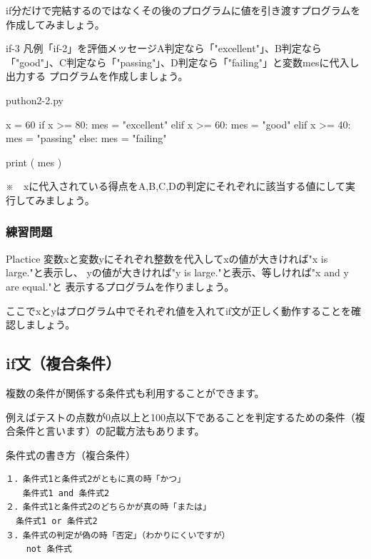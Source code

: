 \documentclass[11pt,a4paper,dvipdfmx,titlepage]{jsreport}
\begin{document}
if分だけで完結するのではなくその後のプログラムに値を引き渡すプログラムを作成してみましょう。
\begin{pabox}{if-3}
凡例「if-2」を評価メッセージA判定なら「"excellent"」、B判定なら「"good"」、C判定なら「"passing"」、D判定なら「"failing"」と変数mesに代入し出力する
プログラムを作成しましょう。

\begin{legbox}{puthon2-2.py}
\begin{listing}{1}
x = 60
if x >= 80:
    mes = "excellent"
elif x >= 60:
    mes = "good"
elif x >= 40:
    mes = "passing"
else:
    mes = "failing"

print ( mes )
\end{listing}
\end{legbox}

※　xに代入されている得点をA,B,C,Dの判定にそれぞれに該当する値にして実行してみましょう。
\end{pabox}
\subsubsection{練習問題}
\begin{plabox}{Plactice}
変数xと変数yにそれぞれ整数を代入してxの値が大きければ"x is large."と表示し、
yの値が大きければ"y is large."と表示、等しければ"x and y are equal."と
表示するプログラムを作りましょう。

ここでxとyはプログラム中でそれぞれ値を入れてif文が正しく動作することを確認しましょう。

\end{plabox}
\newpage
\subsection{if文（複合条件）}
複数の条件が関係する条件式も利用することができます。

例えばテストの点数が0点以上と100点以下であることを判定するための条件（複合条件と言います）の記載方法もあります。

\begin{grabox}{条件式の書き方（複合条件）}
\begin{verbatim}
１．条件式1と条件式2がともに真の時「かつ」
　　条件式1 and 条件式2
２．条件式1と条件式2のどちらかが真の時「または」
  条件式1 or 条件式2
３．条件式の判定が偽の時「否定」（わかりにくいですが）
    not 条件式
\end{verbatim}

\end{grabox}
\end{document}

